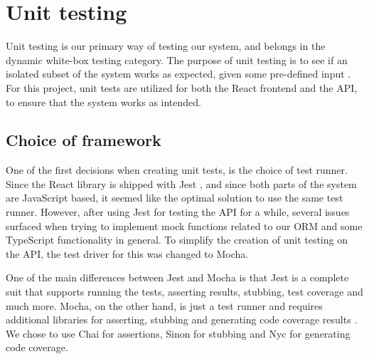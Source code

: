 \section{Unit testing}
Unit testing is our primary way of testing our system, and belongs in the dynamic white-box testing category.
The purpose of unit testing is to see if an isolated subset of the system works as expected, given some pre-defined input \cite{TestDrivenDevelopment}.
For this project, unit tests are utilized for both the React frontend and the API, to ensure that the system works as intended.

\subsection{Choice of framework}
One of the first decisions when creating unit tests, is the choice of test runner.
Since the React library is shipped with Jest \cite{ReactRunningTests}, and since both parts of the system are JavaScript based, it seemed like the optimal solution to use the same test runner.
However, after using Jest for testing the API for a while, several issues surfaced when trying to implement mock functions related to our ORM and some TypeScript functionality in general.
To simplify the creation of unit testing on the API, the test driver for this was changed to Mocha.

One of the main differences between Jest and Mocha is that Jest is a complete suit that supports running the tests, asserting results, stubbing, test coverage and much more.
Mocha, on the other hand, is just a test runner and requires additional libraries for asserting, stubbing and generating code coverage results \cite{Mocha}.
We chose to use Chai for assertions, Sinon for stubbing and Nyc for generating code coverage.

